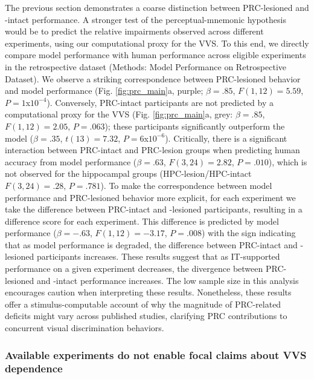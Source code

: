 \documentclass[11pt]{article}
\begin{document}
The previous section demonstrates a coarse distinction between PRC-lesioned and -intact performance. A stronger test of the perceptual-mnemonic hypothesis would be to predict the relative impairments observed across different experiments, using our computational proxy for the VVS. To this end, we directly compare model performance with human performance across eligible experiments in the retrospective dataset (Methods: Model Performance on Retrospective Dataset). We observe a striking correspondence between PRC-lesioned behavior and model performance (Fig. \ref{fig:prc_main}a, purple; $\beta = .85$, $F(1, 12) = 5.59$, $P = 1$x$10^{-4}$). Conversely, PRC-intact participants are not predicted by a computational proxy for the VVS (Fig. \ref{fig:prc_main}a, grey: $\beta = .85$, $F(1, 12) = 2.05$, $P = .063$); these participants significantly outperform the model ($\beta = .35$, $t(13) = 7.32$, $P = 6$x$10^{-6}$). Critically, there is a significant interaction between PRC-intact and PRC-lesion groups when predicting human accuracy from model performance ($\beta = .63$, $F(3, 24) = 2.82$, $P = .010$), which is not observed for the hippocampal groups (HPC-lesion/HPC-intact $F(3, 24) = .28$, $P = .781$). To make the correspondence between model performance and PRC-lesioned behavior more explicit, for each experiment we take the difference between PRC-intact and -lesioned participants, resulting in a difference score for each experiment. This difference is predicted by model performance ($\beta = -.63$, $F(1, 12) = -3.17$, $P = .008$) with the sign indicating that as model performance is degraded, the difference between PRC-intact and -lesioned participants increases. These results suggest that as IT-supported performance on a given experiment decreases, the divergence between PRC-lesioned and -intact performance increases. The low sample size in this analysis encourages caution when interpreting these results\cite{poldrack2015progress}. Nonetheless, these results offer a stimulus-computable account of why the magnitude of PRC-related deficits might vary across published studies, clarifying PRC contributions to concurrent visual discrimination behaviors. 

\subsubsection{Available experiments do not enable focal claims about VVS dependence}
\end{document}
